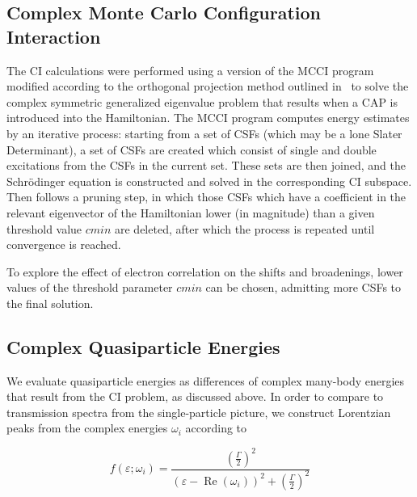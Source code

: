 \subsection{Complex Monte Carlo Configuration Interaction}

The \ac{CI} calculations were performed using a version of the \ac{MCCI}
program~\cite{mcci1998, mcci2000} modified according to the orthogonal
projection method outlined in~\cite{tarantelli_csd} to solve the complex
symmetric generalized eigenvalue problem that results when a \ac{CAP} is
introduced into the Hamiltonian. The \ac{MCCI} program computes energy
estimates by an iterative process: starting from a set of \acp{CSF} (which may
be a lone Slater Determinant), a set of \acp{CSF} are created which consist of
single and double excitations from the \acp{CSF} in the current set. These sets
are then joined, and the Schr\"odinger equation is constructed and solved in
the corresponding \ac{CI} subspace. Then follows a pruning step, in which those
\acp{CSF} which have a coefficient in the relevant eigenvector of the
Hamiltonian lower (in magnitude) than a given threshold value $cmin$ are
deleted, after which the process is repeated until convergence is reached.

To explore the effect of electron correlation on the shifts and broadenings,
lower values of the threshold parameter $cmin$ can be chosen, admitting more
\acp{CSF} to the final solution.

\subsection{Complex Quasiparticle Energies}

We evaluate quasiparticle energies as differences of complex many-body energies
that result from the \ac{CI} problem, as discussed above. In order to compare
to transmission spectra from the single-particle picture, we construct
Lorentzian peaks from the complex energies $\omega_i$ according to

\begin{equation}
	f(\varepsilon;\omega_i)
	= \frac{\left( \frac{\Gamma}{2} \right)^2}
	       {(\varepsilon - \operatorname{Re}(\omega_i))^2
	       + \left( \frac{\Gamma}{2} \right)^2}
	\label{eq:lobro}
\end{equation}

